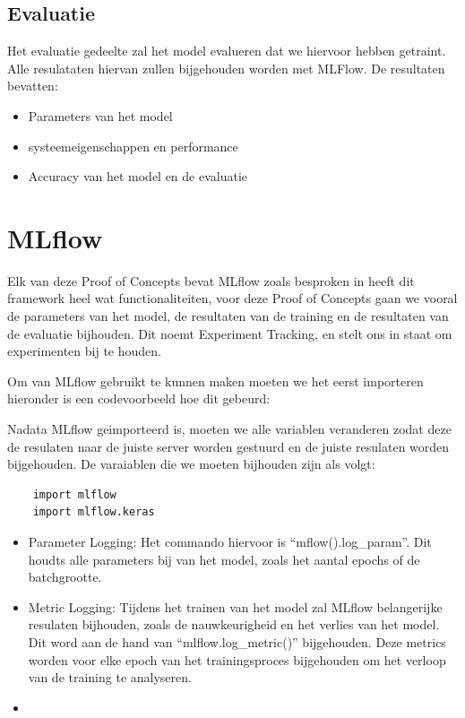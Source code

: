 \subsection{Evaluatie}
Het evaluatie gedeelte zal het model evalueren dat we hiervoor hebben getraint. Alle resulataten hiervan zullen bijgehouden worden met MLFlow. De resultaten bevatten:
\begin{itemize}
    \item Parameters van het model
    \item systeemeigenschappen en performance
    \item Accuracy van het model en de evaluatie
\end{itemize}

\section{MLflow}
Elk van deze Proof of Concepts bevat MLflow zoals besproken in heeft dit framework heel wat functionaliteiten, voor deze Proof of Concepts gaan we vooral de parameters van het model, de resultaten van de training en de resultaten van de evaluatie bijhouden.
Dit noemt Experiment Tracking, en stelt ons in staat om experimenten bij te houden.

Om van MLflow gebruikt te kunnen maken moeten we het eerst importeren hieronder is een codevoorbeeld hoe dit gebeurd:

Nadata MLflow geimporteerd is, moeten we alle variablen veranderen zodat deze de resulaten naar de juiste server worden gestuurd en de juiste resulaten worden bijgehouden.
De varaiablen die we moeten bijhouden zijn als volgt:
\begin{verbatim}
    import mlflow
    import mlflow.keras
\end{verbatim}

\begin{itemize}
    \item Parameter Logging: Het commando hiervoor is ``mflow().log\_param''. Dit houdts alle parameters bij van het model, zoals het aantal epochs of de batchgrootte.
    \item Metric Logging: Tijdens het trainen van het model zal MLflow belangerijke resulaten bijhouden, zoals de nauwkeurigheid en het verlies van het model. Dit word aan de hand van ``mlflow.log\_metric()'' bijgehouden. Deze metrics worden voor elke epoch van het trainingsproces bijgehouden om het verloop van de training te analyseren.
    \item 
\end{itemize}

